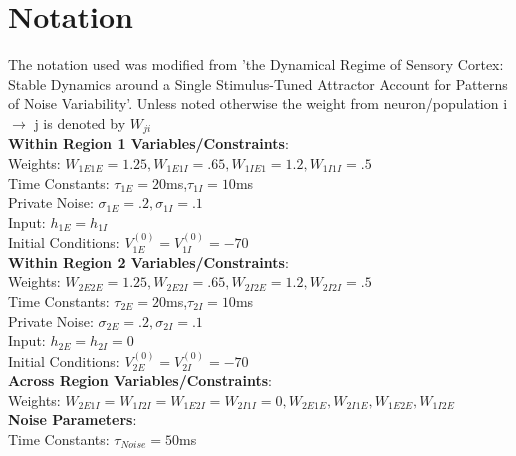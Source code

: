 \documentclass[10pt]{article}
\begin{document}
\section{Notation}
The notation used was modified from 'the Dynamical Regime of Sensory Cortex: Stable Dynamics around a Single
Stimulus-Tuned Attractor Account for Patterns of Noise Variability'. Unless noted otherwise the weight from neuron/population i $\to$ j is denoted by $W_{ji}$\\
\textbf{Within Region 1 Variables/Constraints}:\\
\hspace*{1cm} Weights: $W_{1E1E}=1.25,W_{1E1I}=.65,W_{1IE1}=1.2,W_{1I1I}=.5$\\
\hspace*{1cm} Time Constants: $\tau_{1E} = 20$ms,$\tau_{1I}=10$ms\\
\hspace*{1cm} Private Noise: $\sigma_{1E} = .2, \sigma_{1I} = .1$\\
\hspace*{1cm} Input: $h_{1E} = h_{1I}$\\
\hspace*{1cm} Initial Conditions: $V^{(0)}_{1E} = V^{(0)}_{1I} = -70$\\
\textbf{Within Region 2 Variables/Constraints}:\\
\hspace*{1cm} Weights: 
$W_{2E2E}=1.25,W_{2E2I}=.65,W_{2I2E}=1.2,W_{2I2I}=.5$\\
\hspace*{1cm} Time Constants: $\tau_{2E}=20$ms,$\tau_{2I}=10$ms\\
\hspace*{1cm} Private Noise: $\sigma_{2E} = .2, \sigma_{2I} = .1$\\
\hspace*{1cm} Input: $h_{2E} = h_{2I} = 0$\\
\hspace*{1cm} Initial Conditions: $V^{(0)}_{2E}=V^{(0)}_{2I}=-70$\\
\textbf{Across Region Variables/Constraints}:\\
\hspace*{1cm} Weights: $W_{2E1I} = W_{1I2I} = W_{1E2I}=W_{2I1I} = 0, W_{2E1E},W_{2I1E},W_{1E2E},W_{1I2E}$\\
\textbf{Noise Parameters}:\\
\hspace*{1cm} Time Constants: $\tau_{Noise} = 50$ms\\
\end{document}
